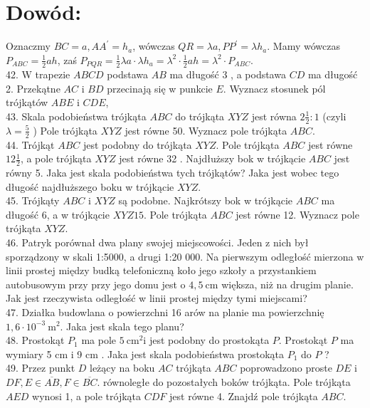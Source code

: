 \documentclass[10pt]{article}
\begin{document}
\section*{Dowód:}
Oznaczmy \(B C=a, A A^{\prime}=h_{a}\), wówczas \(Q R=\lambda a, P P^{\prime}=\lambda h_{a}\). Mamy wówczas \(P_{A B C}=\frac{1}{2} a h\), zaś \(P_{P Q R}=\frac{1}{2} \lambda a \cdot \lambda h_{a}=\lambda^{2} \cdot \frac{1}{2} a h=\lambda^{2} \cdot P_{A B C}\).\\
42. W trapezie \(A B C D\) podstawa \(A B\) ma długość 3 , a podstawa \(C D\) ma długość 2. Przekątne \(A C\) i \(B D\) przecinają się w punkcie \(E\). Wyznacz stosunek pól trójkątów \(A B E\) i \(C D E\),\\
43. Skala podobieństwa trójkąta \(A B C\) do trójkąta \(X Y Z\) jest równa \(2 \frac{1}{2}: 1\) (czyli \(\lambda=\frac{5}{2}\) ) Pole trójkąta \(X Y Z\) jest równe 50. Wyznacz pole trójkąta \(A B C\).\\
44. Trójkąt \(A B C\) jest podobny do trójkąta \(X Y Z\). Pole trójkąta \(A B C\) jest równe \(12 \frac{1}{2}\), a pole trójkąta \(X Y Z\) jest równe 32 . Najdłuższy bok w trójkącie \(A B C\) jest równy 5. Jaka jest skala podobieństwa tych trójkątów? Jaka jest wobec tego długość najdłuższego boku w trójkącie \(X Y Z\).\\
45. Trójkąty \(A B C\) i \(X Y Z\) są podobne. Najkrótszy bok w trójkącie \(A B C\) ma długość 6, a w trójkącie \(X Y Z 15\). Pole trójkąta \(A B C\) jest równe 12. Wyznacz pole trójkąta \(X Y Z\).\\
46. Patryk porównał dwa plany swojej miejscowości. Jeden z nich był sporządzony w skali 1:5000, a drugi 1:20 000. Na pierwszym odległość mierzona w linii prostej między budką telefoniczną koło jego szkoły a przystankiem autobusowym przy przy jego domu jest o \(4,5 \mathrm{~cm}\) większa, niż na drugim planie. Jak jest rzeczywista odległość w linii prostej między tymi miejscami?\\
47. Działka budowlana o powierzchni 16 arów na planie ma powierzchnię \(1,6 \cdot 10^{-3} \mathrm{~m}^{2}\). Jaka jest skala tego planu?\\
48. Prostokąt \(P_{1}\) ma pole \(5 \mathrm{~cm}^{2} \mathrm{i}\) jest podobny do prostokąta \(P\). Prostokąt \(P\) ma wymiary 5 cm i 9 cm . Jaka jest skala podobieństwa prostokąta \(P_{1}\) do \(P\) ?\\
49. Przez punkt \(D\) leżący na boku \(A C\) trójkąta \(A B C\) poprowadzono proste \(D E\) i \(D F, E \in \overline{A B}, F \in \overline{B C}\). równoległe do pozostałych boków trójkąta. Pole trójkąta \(A E D\) wynosi 1, a pole trójkąta \(C D F\) jest równe 4. Znajdź pole trójkąta \(A B C\).\\
\end{document}
